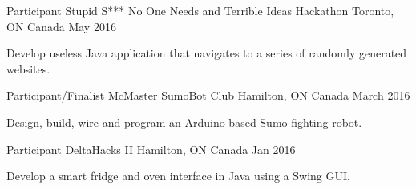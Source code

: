 


\begin{cventries}


\cventry
{Participant} %
{Stupid S*** No One Needs and Terrible Ideas Hackathon} %
{Toronto, ON Canada} %
{May 2016} %
{ %
\begin{cvitems}
\item {Develop useless Java application that navigates to a series of randomly 
generated websites.} 
\end{cvitems}
}


\cventry
{Participant/Finalist} %
{McMaster SumoBot Club} %
{Hamilton, ON Canada} %
{March 2016} %
{ %
\begin{cvitems}
\item {Design, build, wire and program an Arduino based Sumo fighting robot.}
\end{cvitems}
}


\cventry
{Participant} %
{DeltaHacks II} %
{Hamilton, ON Canada} %
{Jan 2016} %
{ %
\begin{cvitems}
\item {Develop a smart fridge and oven interface in Java using a Swing GUI.}
\end{cvitems}
}


\end{cventries}